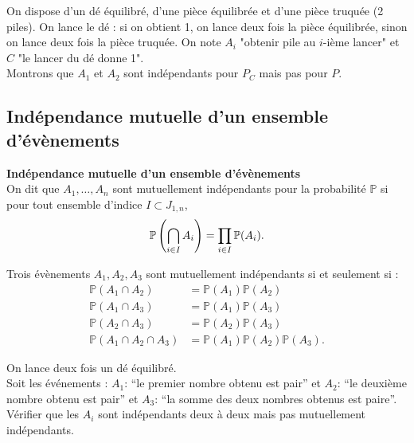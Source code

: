 \documentclass[../PolyS4.tex]{subfiles}
\begin{document}
\begin{Ex}
On dispose d'un dé équilibré, d'une pièce équilibrée et d'une pièce truquée (2 piles). On lance le dé : si on obtient 1, on lance deux fois la pièce équilibrée, sinon on lance deux fois la pièce truquée. On note $A_i$ "obtenir pile au $i$-ième lancer" et $C$ "le lancer du dé donne 1".\\
 Montrons que $A_1$ et $A_2$ sont indépendants pour $P_C$ mais pas pour $P$.\\
\end{Ex}

\subsection{Indépendance mutuelle d'un ensemble d'évènements}

\begin{Def}\textbf{Indépendance mutuelle d'un ensemble d'évènements}\\
On dit que $A_1, \ldots, A_n$ sont mutuellement indépendants pour la probabilité $\mathbb{P}$ si pour tout ensemble d'indice $I \subset J_{1,n}$,
\[
\mathbb{P} \left( \bigcap_{i \in I} A_i \right) = \prod_{i \in I} \mathbb{P} (A_i).\\
\]
\end{Def}

\begin{Ex}  Trois évènements $A_1, A_2, A_3$ sont mutuellement indépendants si et seulement si :\\
$$
\begin{array}{ll}
\mathbb{P} (A_1 \cap A_2) & = \mathbb{P} (A_1)\mathbb{P} (A_2) \\
\mathbb{P} (A_1 \cap A_3) & = \mathbb{P} (A_1)\mathbb{P} (A_3) \\
\mathbb{P} (A_2 \cap A_3) & = \mathbb{P} (A_2)\mathbb{P} (A_3) \\
\mathbb{P} (A_1 \cap A_2 \cap A_3) & = \mathbb{P} (A_1)\mathbb{P} (A_2)\mathbb{P} (A_3).
\end{array}
$$

\end{Ex}


On lance deux fois un dé équilibré.\\
 Soit les événements : $A_1$: “le premier nombre obtenu est pair” et $A_2$: “le deuxième nombre obtenu est pair” et $A_3$: “la somme des deux nombres obtenus est paire”. Vérifier que les $A_i$ sont indépendants deux à deux mais pas mutuellement indépendants.\\
\end{document}
